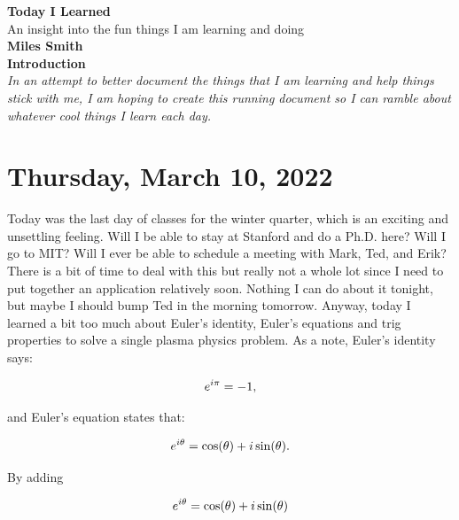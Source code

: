 \documentclass[12pt]{article}
\begin{document}
\begin{center}
\huge{\textbf{Today I Learned}}\\
\large{An insight into the fun things I am learning and doing}\\

\vspace*{0.5cm}
\textbf{Miles Smith}\\

\vspace*{1cm}
\textbf{Introduction}\\
\textit{In an attempt to better document the things that I am learning and help things stick with me, I am hoping to create this running document so I can ramble about whatever cool things I learn each day.}\\
\vspace*{2cm}
\clearpage

\end{center}

\section{Thursday, March 10, 2022}

\par
Today was the last day of classes for the winter quarter, which is an exciting and unsettling feeling. Will I be able to stay at Stanford and do a Ph.D. here? Will I go to MIT? Will I ever be able to schedule a meeting with Mark, Ted, and Erik? There is a bit of time to deal with this but really not a whole lot since I need to put together an application relatively soon. Nothing I can do about it tonight, but maybe I should bump Ted in the morning tomorrow. Anyway, today I learned a bit too much about Euler's identity, Euler's equations and trig properties to solve a single plasma physics problem.  As a note, Euler's identity says:

\begin{equation}
\centering
e^{i\pi} = -1, 
\end{equation}

and Euler's equation states that:

\begin{equation}
\centering
e^{i\theta} = \cos(\theta) + i \sin(\theta).
\end{equation}

By adding 

\begin{equation}
\centering
e^{i\theta} = \cos(\theta) + i \sin(\theta)
\end{equation} 
\end{document}
